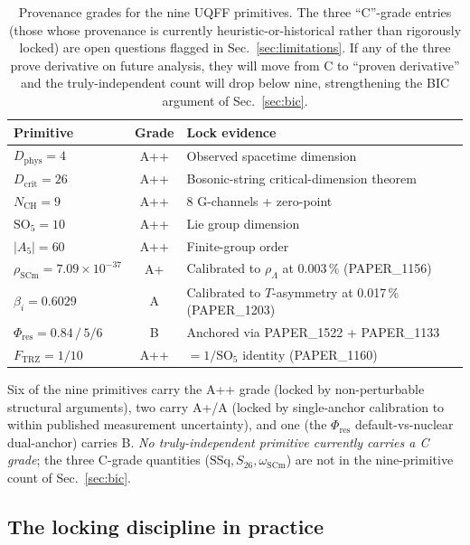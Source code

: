 \begin{table}[H]
\centering
\caption{Provenance grades for the nine UQFF primitives. The three
``C''-grade entries (those whose provenance is currently
heuristic-or-historical rather than rigorously locked) are open
questions flagged in Sec.~\ref{sec:limitations}. If any of the three
prove derivative on future analysis, they will move from C to
``proven derivative'' and the truly-independent count will drop
below nine, strengthening the BIC argument of Sec.~\ref{sec:bic}.}
\label{tab:current_grades}
\begin{tabular}{l c l}
\toprule
\textbf{Primitive} & \textbf{Grade} & \textbf{Lock evidence} \\
\midrule
$D_{\text{phys}} = 4$ & A++ & Observed spacetime dimension \\
$D_{\text{crit}} = 26$ & A++ & Bosonic-string critical-dimension theorem \\
$N_{\text{CH}} = 9$ & A++ & 8 G-channels + zero-point \\
$\mathrm{SO}_5 = 10$ & A++ & Lie group dimension \\
$|A_5| = 60$ & A++ & Finite-group order \\
$\rho_{\text{SCm}} = 7.09\times 10^{-37}$ & A+ & Calibrated to $\rho_\Lambda$ at 0.003\,\% (PAPER\_1156) \\
$\beta_i = 0.6029$ & A & Calibrated to $T$-asymmetry at 0.017\,\% (PAPER\_1203) \\
$\Phi_{\text{res}} = 0.84\,/\,5/6$ & B & Anchored via PAPER\_1522 + PAPER\_1133 \\
$F_{\text{TRZ}} = 1/10$ & A++ & $= 1/\mathrm{SO}_5$ identity (PAPER\_1160) \\
\bottomrule
\end{tabular}
\end{table}

Six of the nine primitives carry the A++ grade (locked by
non-perturbable structural arguments), two carry A+/A (locked by
single-anchor calibration to within published measurement
uncertainty), and one (the $\Phi_{\text{res}}$ default-vs-nuclear
dual-anchor) carries B. \emph{No truly-independent primitive
currently carries a C grade}; the three C-grade quantities
($\mathrm{SSq}, S_{26}, \omega_{\text{SCm}}$) are not in the
nine-primitive count of Sec.~\ref{sec:bic}.

\subsection{The locking discipline in practice}
\label{sec:locking_in_practice}

